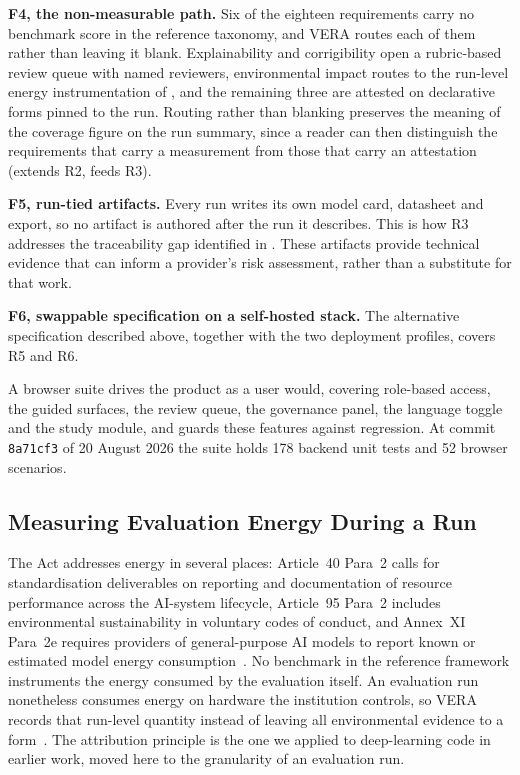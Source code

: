 \documentclass[10pt,conference,a4paper]{IEEEtran}
\begin{document}
\textbf{F4, the non-measurable path.}
Six of the eighteen requirements carry no benchmark score in the reference taxonomy, and VERA routes each of them rather than leaving it blank.
Explainability and corrigibility open a rubric-based review queue with named reviewers, environmental impact routes to the run-level energy instrumentation of , and the remaining three are attested on declarative forms pinned to the run.
Routing rather than blanking preserves the meaning of the coverage figure on the run summary, since a reader can then distinguish the requirements that carry a measurement from those that carry an attestation (extends R2, feeds R3).

\textbf{F5, run-tied artifacts.}
Every run writes its own model card, datasheet and export, so no artifact is authored after the run it describes.
This is how R3 addresses the traceability gap identified in .
These artifacts provide technical evidence that can inform a provider's risk assessment, rather than a substitute for that work.

\textbf{F6, swappable specification on a self-hosted stack.}
The alternative specification described above, together with the two deployment profiles, covers R5 and R6.

A browser suite drives the product as a user would, covering role-based access, the guided surfaces, the review queue, the governance panel, the language toggle and the study module, and guards these features against regression.
At commit \texttt{8a71cf3} of 20 August 2026 the suite holds 178 backend unit tests and 52 browser scenarios.

\subsection{Measuring Evaluation Energy During a Run}
\label{sec:energy}
The Act addresses energy in several places: Article~40 Para~2 calls for standardisation deliverables on reporting and documentation of resource performance across the AI-system lifecycle, Article~95 Para~2 includes environmental sustainability in voluntary codes of conduct, and Annex~XI Para~2e requires providers of general-purpose AI models to report known or estimated model energy consumption~\cite{euaiact2024}.
No benchmark in the reference framework instruments the energy consumed by the evaluation itself.
An evaluation run nonetheless consumes energy on hardware the institution controls, so VERA records that run-level quantity instead of leaving all environmental evidence to a form~\cite{guldimann2024complai}.
The attribution principle is the one we applied to deep-learning code in earlier work, moved here to the granularity of an evaluation run.
\end{document}
